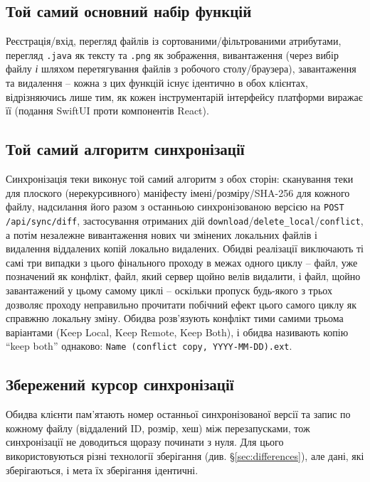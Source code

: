 \documentclass[12pt,a4paper]{article}
\begin{document}
\subsection{Той самий основний набір функцій}

Реєстрація/вхід, перегляд файлів із сортованими/фільтрованими атрибутами, перегляд \texttt{.java} як тексту та \texttt{.png} як зображення, вивантаження (через вибір файлу \emph{і} шляхом перетягування файлів з робочого столу/браузера), завантаження та видалення -- кожна з цих функцій існує ідентично в обох клієнтах, відрізняючись лише тим, як кожен інструментарій інтерфейсу платформи виражає її (подання SwiftUI проти компонентів React).

\subsection{Той самий алгоритм синхронізації}

Синхронізація теки виконує той самий алгоритм з обох сторін: сканування теки для плоского (нерекурсивного) маніфесту імені/розміру/SHA-256 для кожного файлу, надсилання його разом з останньою синхронізованою версією на \texttt{POST /api/sync/diff}, застосування отриманих дій \texttt{download}/\texttt{delete\_local}/\texttt{conflict}, а потім незалежне вивантаження нових чи змінених локальних файлів і видалення віддалених копій локально видалених. Обидві реалізації виключають ті самі три випадки з цього фінального проходу в межах одного циклу -- файл, уже позначений як конфлікт, файл, який сервер щойно велів видалити, і файл, щойно завантажений у цьому самому циклі -- оскільки пропуск будь-якого з трьох дозволяє проходу неправильно прочитати побічний ефект цього самого циклу як справжню локальну зміну. Обидва розв'язують конфлікт тими самими трьома варіантами (Keep Local, Keep Remote, Keep Both), і обидва називають копію ``keep both'' однаково: \texttt{Name (conflict copy, YYYY-MM-DD).ext}.

\subsection{Збережений курсор синхронізації}

Обидва клієнти пам'ятають номер останньої синхронізованої версії та запис по кожному файлу (віддалений ID, розмір, хеш) між перезапусками, тож синхронізації не доводиться щоразу починати з нуля. Для цього використовуються різні технології зберігання (див. \S\ref{sec:differences}), але дані, які зберігаються, і мета їх зберігання ідентичні.
\end{document}
